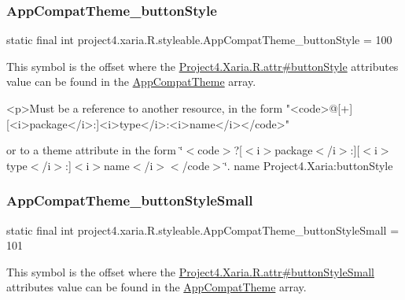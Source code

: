 \subsubsection{\texorpdfstring{App\+Compat\+Theme\+\_\+button\+Style}{AppCompatTheme\_buttonStyle}}
{\footnotesize\ttfamily static final int project4.\+xaria.\+R.\+styleable.\+App\+Compat\+Theme\+\_\+button\+Style = 100\hspace{0.3cm}{\ttfamily [static]}}

This symbol is the offset where the \hyperlink{}{Project4.\+Xaria.\+R.\+attr\#button\+Style} attribute\textquotesingle{}s value can be found in the \hyperlink{classproject4_1_1xaria_1_1R_1_1styleable_aad8bec413e2350f9404e6ff0e831a85d}{App\+Compat\+Theme} array.

\begin{DoxyVerb}      <p>Must be a reference to another resource, in the form "<code>@[+][<i>package</i>:]<i>type</i>:<i>name</i></code>"
\end{DoxyVerb}
 or to a theme attribute in the form \char`\"{}$<$code$>$?\mbox{[}$<$i$>$package$<$/i$>$\+:\mbox{]}\mbox{[}$<$i$>$type$<$/i$>$\+:\mbox{]}$<$i$>$name$<$/i$>$$<$/code$>$\char`\"{}.  name Project4.\+Xaria\+:button\+Style \mbox{\label{classproject4_1_1xaria_1_1R_1_1styleable_ab6a564eb1b7f2c965484ca489fb8e95c}} 
\subsubsection{\texorpdfstring{App\+Compat\+Theme\+\_\+button\+Style\+Small}{AppCompatTheme\_buttonStyleSmall}}
{\footnotesize\ttfamily static final int project4.\+xaria.\+R.\+styleable.\+App\+Compat\+Theme\+\_\+button\+Style\+Small = 101\hspace{0.3cm}{\ttfamily [static]}}

This symbol is the offset where the \hyperlink{}{Project4.\+Xaria.\+R.\+attr\#button\+Style\+Small} attribute\textquotesingle{}s value can be found in the \hyperlink{classproject4_1_1xaria_1_1R_1_1styleable_aad8bec413e2350f9404e6ff0e831a85d}{App\+Compat\+Theme} array.

